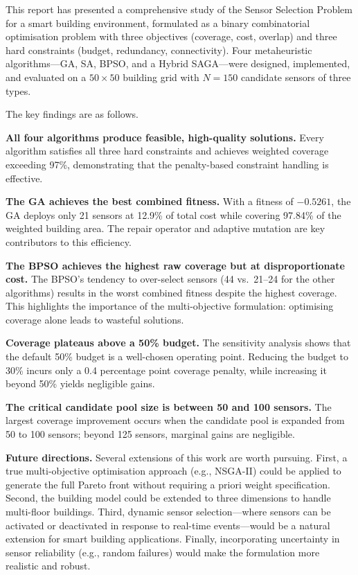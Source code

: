 \documentclass[12pt,a4paper]{article}
\begin{document}
This report has presented a comprehensive study of the Sensor Selection Problem for a smart building environment, formulated as a binary combinatorial optimisation problem with three objectives (coverage, cost, overlap) and three hard constraints (budget, redundancy, connectivity).
Four metaheuristic algorithms---GA, SA, BPSO, and a Hybrid SAGA---were designed, implemented, and evaluated on a $50 \times 50$ building grid with $N = 150$ candidate sensors of three types.

The key findings are as follows.

\textbf{All four algorithms produce feasible, high-quality solutions.}
Every algorithm satisfies all three hard constraints and achieves weighted coverage exceeding 97\%, demonstrating that the penalty-based constraint handling is effective.

\textbf{The GA achieves the best combined fitness.}
With a fitness of $-0.5261$, the GA deploys only 21 sensors at 12.9\% of total cost while covering 97.84\% of the weighted building area.
The repair operator and adaptive mutation are key contributors to this efficiency.

\textbf{The BPSO achieves the highest raw coverage but at disproportionate cost.}
The BPSO's tendency to over-select sensors (44 vs.\ 21--24 for the other algorithms) results in the worst combined fitness despite the highest coverage.
This highlights the importance of the multi-objective formulation: optimising coverage alone leads to wasteful solutions.

\textbf{Coverage plateaus above a 50\% budget.}
The sensitivity analysis shows that the default 50\% budget is a well-chosen operating point.
Reducing the budget to 30\% incurs only a 0.4 percentage point coverage penalty, while increasing it beyond 50\% yields negligible gains.

\textbf{The critical candidate pool size is between 50 and 100 sensors.}
The largest coverage improvement occurs when the candidate pool is expanded from 50 to 100 sensors; beyond 125 sensors, marginal gains are negligible.

\textbf{Future directions.}
Several extensions of this work are worth pursuing.
First, a true multi-objective optimisation approach (e.g., NSGA-II) could be applied to generate the full Pareto front without requiring a priori weight specification.
Second, the building model could be extended to three dimensions to handle multi-floor buildings.
Third, dynamic sensor selection---where sensors can be activated or deactivated in response to real-time events---would be a natural extension for smart building applications.
Finally, incorporating uncertainty in sensor reliability (e.g., random failures) would make the formulation more realistic and robust.
\end{document}
